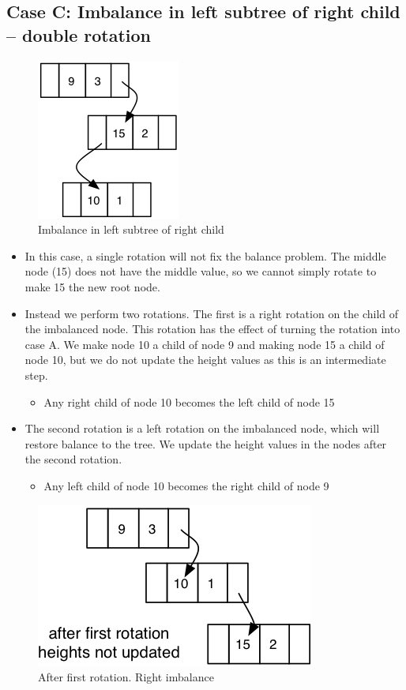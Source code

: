 \subsection{Case C: Imbalance in left subtree of right child – double rotation}

\begin{figure}[H]
\centering
\includegraphics{pictures/tree19.png}
\caption{Imbalance in left subtree of right child}
\label{fig:tree19}
\end{figure}

\begin{itemize}
	\item In this case, a single rotation will not fix the balance problem.  The middle node (15) does not have the middle value, so we cannot simply rotate to make 15 the new root node.  
	\item Instead we perform two rotations. The first is a right rotation on the child of the imbalanced node. This rotation has the effect of turning the rotation into case A.  We make node 10 a child of node 9 and making node 15 a child of node 10, but we do not update the height values as this is an intermediate step.
\begin{itemize}
	\item Any right child of node 10 becomes the left child of node 15
\end{itemize}
	\item The second rotation is a left rotation on the imbalanced node, which will restore balance to the tree.  We update the height values in the nodes after the second rotation.
\begin{itemize}
	\item Any left child of node 10 becomes the right child of node 9
\end{itemize}
\end{itemize}

\begin{figure}[H]
\centering
\includegraphics{pictures/tree20.png}
\caption{After first rotation. Right imbalance}
\label{fig:tree20}
\end{figure}

